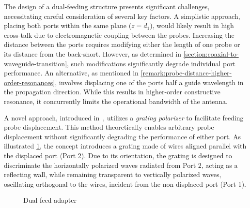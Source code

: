 \documentclass[11pt,a4paper,twoside,openany]{report}
\newlength{\twosubht}
\begin{document}
The design of a dual-feeding structure presents significant challenges, necessitating careful consideration of several key factors. A simplistic approach, placing both ports within the same plane ($z = d_1$), would likely result in high cross-talk due to electromagnetic coupling between the probes. Increasing the distance between the ports requires modifying either the length of one probe or its distance from the back-short. However, as determined in \cref{section:coaxial-to-waveguide-transition}, such modifications significantly degrade individual port performance. An alternative, as mentioned in \cref{remark:probe-distance-higher-order-resonances}, involves displacing one of the ports half a guide wavelength in the propagation direction. While this results in higher-order constructive resonance, it concurrently limits the operational bandwidth of the antenna.

A novel approach, introduced in~\parencite{karki-et-al:dual-polarized-probe-for-planar-near-field-measurement}, utilizes a \emph{grating polarizer} to facilitate feeding probe displacement. This method theoretically enables arbitrary probe displacement without significantly degrading the performance of either port. As illustrated \cref{fig:dual-feed-model}, the concept introduces a grating made of wires aligned parallel with the displaced port (Port 2). Due to its orientation, the grating is designed to discriminate the horizontally polarized waves radiated from Port 2, acting as a reflecting wall, while remaining transparent to vertically polarized waves, oscillating orthogonal to the wires, incident from the non-displaced port (Port 1).

\begin{figure}[bh]
    \sbox{}
    \setlength{\twosubht}{\ht\twosubbox}

    \centering
    \quad
    \caption{\label{fig:dual-feed-model}Dual feed adapter}
\end{figure}
\end{document}
